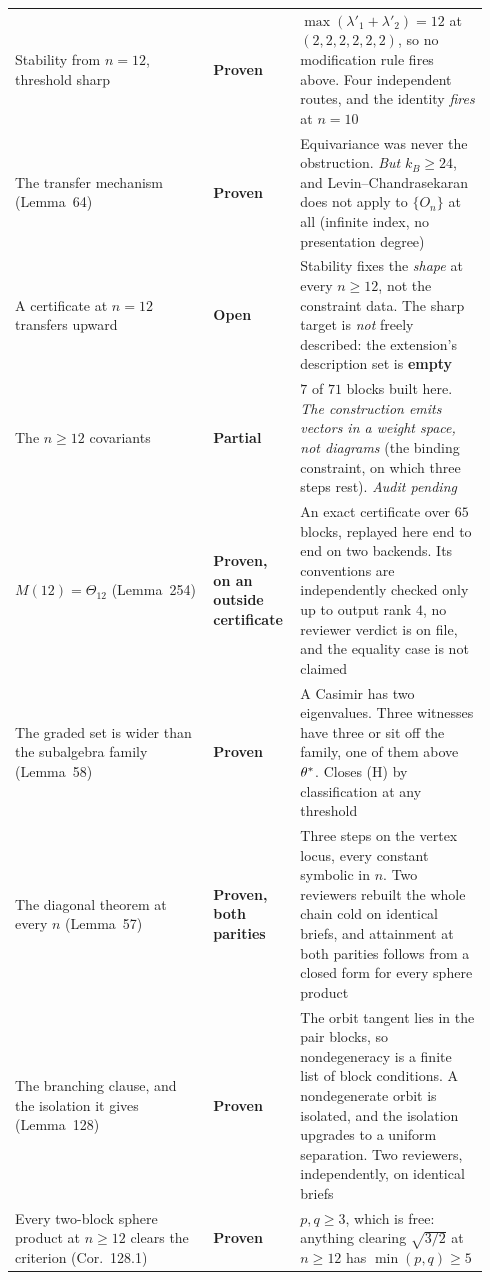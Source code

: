 \begin{longtable}{@{}p{0.40\linewidth}p{0.16\linewidth}p{0.38\linewidth}@{}}
Stability from $n=12$, threshold sharp & \textbf{Proven} & $\max(\lambda'_1+\lambda'_2)=12$ at $(2,2,2,2,2,2)$, so no modification rule fires above. Four independent routes, and the identity \emph{fires} at $n=10$ \\
The transfer mechanism (Lemma~64) & \textbf{Proven} & Equivariance was never the obstruction. \emph{But} $k_B\ge24$, and Levin--Chandrasekaran does not apply to $\{O_n\}$ at all (infinite index, no presentation degree) \\
A certificate at $n=12$ transfers upward & \textbf{Open} & Stability fixes the \emph{shape} at every $n\ge12$, not the constraint data. The sharp target is \emph{not} freely described: the extension's description set is \textbf{empty} \\
The $n\ge12$ covariants & \textbf{Partial} & $7$ of $71$ blocks built here. \emph{The construction emits vectors in a weight space, not diagrams} (the binding constraint, on which three steps rest). \emph{Audit pending} \\
$M(12)=\Theta_{12}$ (Lemma~254) & \textbf{Proven, on an outside certificate} & An exact certificate over $65$ blocks, replayed here end to end on two backends. Its conventions are independently checked only up to output rank $4$, no reviewer verdict is on file, and the equality case is not claimed \\
The graded set is wider than the subalgebra family (Lemma~58) & \textbf{Proven} & A Casimir has two eigenvalues. Three witnesses have three or sit off the family, one of them above $\theta^{*}$. Closes (H) by classification at any threshold \\
The diagonal theorem at every $n$ (Lemma~57) & \textbf{Proven, both parities} & Three steps on the vertex locus, every constant symbolic in $n$. Two reviewers rebuilt the whole chain cold on identical briefs, and attainment at both parities follows from a closed form for every sphere product \\
The branching clause, and the isolation it gives (Lemma~128) & \textbf{Proven} & The orbit tangent lies in the pair blocks, so nondegeneracy is a finite list of block conditions. A nondegenerate orbit is isolated, and the isolation upgrades to a uniform separation. Two reviewers, independently, on identical briefs \\
Every two-block sphere product at $n\ge12$ clears the criterion (Cor.~128.1) & \textbf{Proven} & $p,q\ge3$, which is free: anything clearing $\sqrt{3/2}$ at $n\ge12$ has $\min(p,q)\ge5$ \\

\end{longtable}
